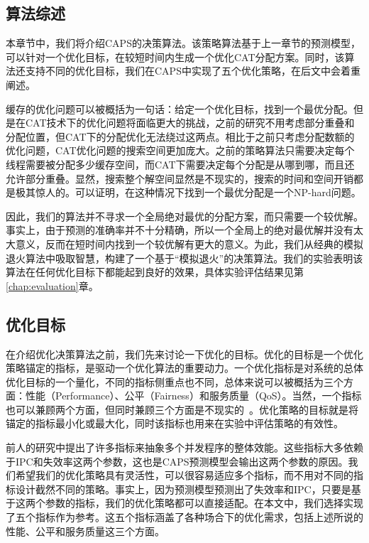 \subsection{算法综述}

本章节中，我们将介绍CAPS的决策算法。该策略算法基于上一章节的预测模型，可以针对一个优化目标，在较短时间内生成一个优化CAT分配方案。同时，该算法还支持不同的优化目标，我们在CAPS中实现了五个优化策略，在后文中会着重阐述。

缓存的优化问题可以被概括为一句话：给定一个优化目标，找到一个最优分配。但是在CAT技术下的优化问题将面临更大的挑战，之前的研究不用考虑部分重叠和分配位置，但CAT下的分配优化无法绕过这两点。相比于之前只考虑分配数额的优化问题，CAT优化问题的搜索空间更加庞大。之前的策略算法只需要决定每个线程需要被分配多少缓存空间，而CAT下需要决定每个分配是从哪到哪，而且还允许部分重叠。显然，搜索整个解空间显然是不现实的，搜索的时间和空间开销都是极其惊人的。可以证明，在这种情况下找到一个最优分配是一个NP-hard问题。

因此，我们的算法并不寻求一个全局绝对最优的分配方案，而只需要一个较优解。事实上，由于预测的准确率并不十分精确，所以一个全局上的绝对最优解并没有太大意义，反而在短时间内找到一个较优解有更大的意义。为此，我们从经典的模拟退火算法中吸取智慧，构建了一个基于“模拟退火”的决策算法。我们的实验表明该算法在任何优化目标下都能起到良好的效果，具体实验评估结果见第\ref{chap:evaluation}章。

\subsection{优化目标} \label{sec:opt_goals}

在介绍优化决策算法之前，我们先来讨论一下优化的目标。优化的目标是一个优化策略锚定的指标，是驱动一个优化算法的重要动力。一个优化指标是对系统的总体优化目标的一个量化，不同的指标侧重点也不同，总体来说可以被概括为三个方面：性能（Performance）、公平（Fairness）和服务质量（QoS）。当然，一个指标也可以兼顾两个方面，但同时兼顾三个方面是不现实的~\parencite{hsu2006communist}。优化策略的目标就是将锚定的指标最小化或最大化，同时该指标也用来在实验中评估策略的有效性。

前人的研究中提出了许多指标来抽象多个并发程序的整体效能。这些指标大多依赖于IPC和失效率这两个参数，这也是CAPS预测模型会输出这两个参数的原因。我们希望我们的优化策略具有灵活性，可以很容易适应多个指标，而不用对不同的指标设计截然不同的策略。事实上，因为预测模型预测出了失效率和IPC，只要是基于这两个参数的指标，我们的优化策略都可以直接适配。在本文中，我们选择实现了五个指标作为参考。这五个指标涵盖了各种场合下的优化需求，包括上述所说的性能、公平和服务质量这三个方面。

